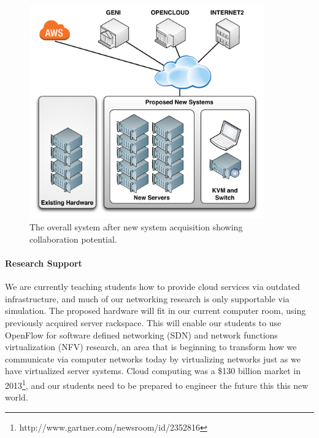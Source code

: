 \documentclass[12pt,letterpaper]{article}
\begin{document}
\begin{figure}[!t]
\centering
\includegraphics[width=0.9\textwidth]{images/system.pdf}
\caption{The overall system after new system acquisition showing collaboration potential.}
\label{fig:conops}
\end{figure}

\paragraph{Research Support} We are currently teaching students how to provide cloud services via outdated infrastructure, and much of our networking research is only supportable via simulation. The proposed hardware will fit in our current computer room, using previously acquired server rackspace. This will enable our students to use OpenFlow for software defined networking (SDN) and network functions virtualization (NFV) research, an area that is beginning to transform how we communicate via computer networks today by virtualizing networks just as we have virtualized server systems. Cloud computing was a \$130 billion market in 2013\footnote{http://www.gartner.com/newsroom/id/2352816}, and our students need to be prepared to engineer the future this this new world.
\end{document}
